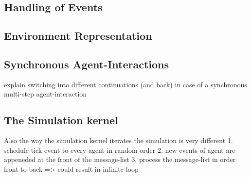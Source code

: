 \subsection{Handling of Events}

\subsection{Environment Representation}

\subsection{Synchronous Agent-Interactions}
explain switching into different continuations (and back) in case of a synchronous multi-step agent-interaction



\subsection{The Simulation kernel}
Also the way the simulation kernel iterates the simulation is very different
1. schedule tick event to every agent in random order
2. new events of agent are appeneded at the front of the message-list
3. process the message-list in order front-to-back => could result in infinite loop

